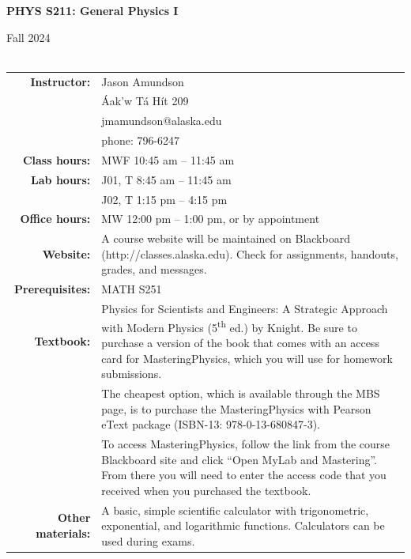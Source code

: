 \documentclass[11pt,letterpaper]{article}
\newcommand{\squeezeup}{\vspace{-2.5mm}}
\newcommand{\tablespace}[0]{\vspace{8pt}}
\begin{document}
\begin{centering}
\textbf{PHYS S211: General Physics I}

Fall 2024\\
\hfill{}\\

\bigskip
\begin{table}[h]
\centering
\setlength{\extrarowheight}{2pt}
\squeezeup
\begin{tabular}{@{}r@{\hspace{0.1in}}p{4.25in}} 
{\bf Instructor:} & Jason Amundson\\
& {\'A}ak'w T{\'a} H{\'i}t 209 \\
& jmamundson@alaska.edu\\
& phone: 796-6247 \tablespace\\
{\bf Class hours:} & MWF 10:45 am -- 11:45 am \tablespace\\
{\bf Lab hours:} & J01, T 8:45 am -- 11:45 am\\
& J02, T 1:15 pm -- 4:15 pm \tablespace\\
{\bf Office hours:} & MW 12:00 pm -- 1:00 pm, or by appointment\tablespace\\
{\bf Website:} & A course website will be maintained on Blackboard (http://classes.alaska.edu). Check for assignments, handouts, grades, and messages.\tablespace\\
{\bf Prerequisites:} & MATH S251\tablespace\\
{\bf Textbook:} & Physics for Scientists and Engineers: A Strategic Approach with Modern Physics (5\textsuperscript{th} ed.) by Knight. Be sure to purchase a version of the book that comes with an access card for MasteringPhysics, which you will use for homework submissions.
\tablespace\\
& The cheapest option, which is available through the MBS page, is to purchase the MasteringPhysics with Pearson eText package (ISBN-13: 978-0-13-680847-3).
\tablespace\\
& To access MasteringPhysics, follow the link from the course Blackboard site and click ``Open MyLab and Mastering''. From there you will need to enter the access code that you received when you purchased the textbook.  \tablespace\\
{\bf Other materials:} & A basic, simple scientific calculator with trigonometric, exponential, and logarithmic functions. Calculators can be used during exams.
\end{tabular}
\end{table}
\end{centering}
\end{document}
